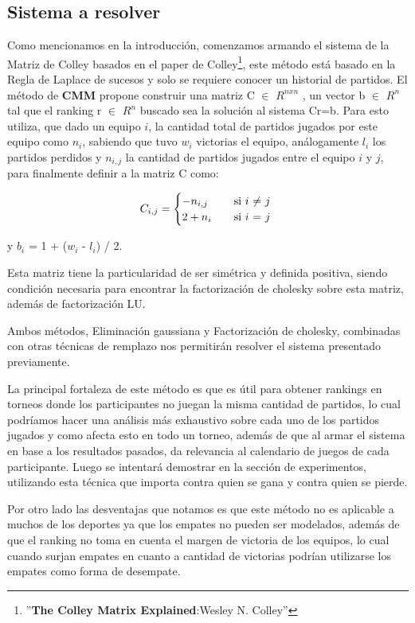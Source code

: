 \subsection{Sistema a resolver}

Como mencionamos en la introducción, comenzamos armando el sistema de la Matriz de Colley basados en el paper de Colley\footnote{''\textbf{The Colley Matrix Explained}:Wesley N. Colley''}, este método está basado en la Regla de Laplace de sucesos y solo se requiere conocer un historial de partidos. 
El método de \textbf{CMM} propone construir una matriz C $\in$ $ R^{nxn}$ , un vector b $\in$ $ R^n$ tal que el ranking r $\in$ $R^n$ buscado sea la solución al sistema Cr=b.
Para esto utiliza, que dado un equipo $i$, la cantidad total de partidos jugados por este equipo como $n_i$, sabiendo que tuvo $w_i$ victorias el equipo, análogamente $l_i$ los partidos perdidos y $n_{i,j}$ la cantidad de partidos jugados entre el equipo $i$ y $j$, para finalmente definir a la matriz C como: 

\[ C_{i,j} =
    \begin{cases}
        -n_{i,j}       & \quad \text{si }  \text{$i$ $\neq$ $j$}\\
        2+n_i & \quad \text{si } \text{$i$ $=$ $j$ }\\
    \end{cases}
$$
  $$  \]
                    
y $b_i$ = 1 +  ($w_i$ - $l_i$) / 2.

Esta matriz tiene la particularidad de ser simétrica y definida positiva, siendo condición necesaria para encontrar la factorización de cholesky sobre esta matriz, además de factorización LU.

Ambos métodos, Eliminación gaussiana y Factorización de cholesky, combinadas con otras técnicas de remplazo nos permitirán resolver el sistema presentado previamente.

La principal fortaleza de este método es que es útil para obtener rankings en torneos donde los participantes no juegan la misma cantidad de partidos, lo cual 
podríamos hacer una análisis más exhaustivo sobre cada uno de los partidos jugados y como afecta esto en todo un torneo,
además de que al armar el sistema en base a los resultados pasados, da relevancia al calendario de juegos de cada participante. 
Luego se intentará demostrar en la sección de experimentos, utilizando esta técnica que importa contra quien se gana y contra quien se pierde.

Por otro lado las desventajas que notamos es que este método no es aplicable a muchos de los deportes ya que los empates no pueden ser modelados, además de que el ranking no toma en cuenta
el margen de victoria de los equipos, lo cual cuando surjan empates en cuanto a cantidad de victorias podrían utilizarse los empates como forma de desempate.

